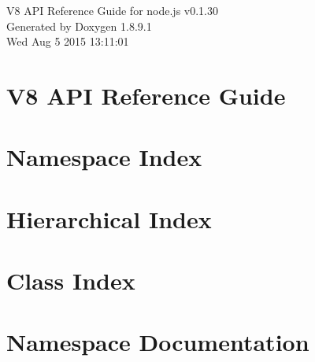 \documentclass[twoside]{book}
\newcommand{\+}{\discretionary{\mbox{\scriptsize$\hookleftarrow$}}{}{}}
\newcommand{\clearemptydoublepage}{%
  \newpage{\pagestyle{empty}\cleardoublepage}%
}
\begin{document}
\hypersetup{pageanchor=false,
             bookmarks=true,
             bookmarksnumbered=true,
             pdfencoding=unicode
            }
\begin{titlepage}
\vspace*{7cm}
\begin{center}%
{\Large V8 A\+P\+I Reference Guide for node.\+js v0.1.30 }\\
\vspace*{1cm}
{\large Generated by Doxygen 1.8.9.1}\\
\vspace*{0.5cm}
{\small Wed Aug 5 2015 13:11:01}\\
\end{center}
\end{titlepage}
\clearemptydoublepage
\tableofcontents
\clearemptydoublepage
{}
\hypersetup{pageanchor=true}

\chapter{V8 A\+P\+I Reference Guide}
\label{index}\hypertarget{index}{}
\chapter{Namespace Index}

\chapter{Hierarchical Index}

\chapter{Class Index}

\chapter{Namespace Documentation}

\end{document}
